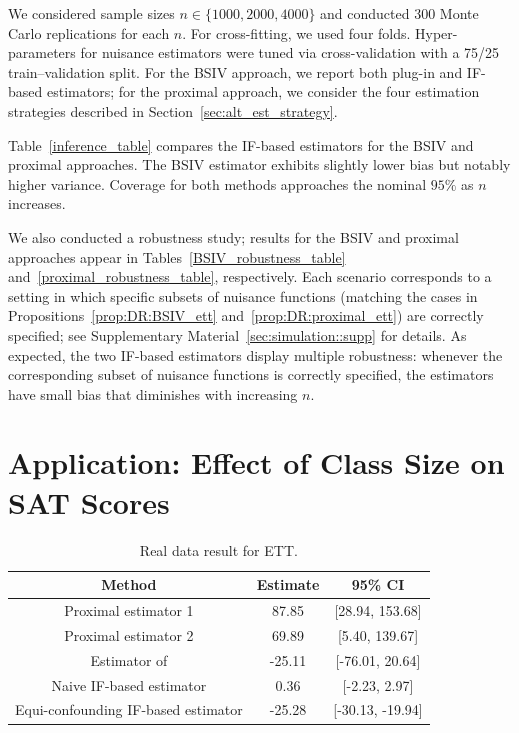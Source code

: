 \documentclass[10pt]{article}
\begin{document}
We considered sample sizes \(n \in \{1000, 2000, 4000\}\) and conducted 300 Monte Carlo replications for each \(n\). For cross-fitting, we used four folds. Hyper-parameters for nuisance estimators were tuned via cross-validation with a 75/25 train–validation split. For the BSIV approach, we report both plug-in and IF-based estimators; for the proximal approach, we consider the four estimation strategies described in Section~\ref{sec:alt_est_strategy}.

Table~\ref{inference_table} compares the IF-based estimators for the BSIV and proximal approaches. The BSIV estimator exhibits slightly lower bias but notably higher variance. Coverage for both methods approaches the nominal \(95\%\) as \(n\) increases.

We also conducted a robustness study; results for the BSIV and proximal approaches appear in Tables~\ref{BSIV_robustness_table} and~\ref{proximal_robustness_table}, respectively. Each scenario corresponds to a setting in which specific subsets of nuisance functions (matching the cases in Propositions~\ref{prop:DR:BSIV_ett} and~\ref{prop:DR:proximal_ett}) are correctly specified; see Supplementary Material~\ref{sec:simulation::supp} for details. As expected, the two IF-based estimators display multiple robustness: whenever the corresponding subset of nuisance functions is correctly specified, the estimators have small bias that diminishes with increasing \(n\).




\section{Application: Effect of Class Size on SAT Scores}
\label{sec:application}

\begin{table}[t]
\centering
\begin{tabular}{c | c c} 
 \hline
  Method & Estimate & 95\% CI \\ [0.5ex] 
 \hline
Proximal estimator 1 & 87.85 & [28.94, 153.68] \\
Proximal estimator 2 & 69.89 & [5.40, 139.67]\\
 \hline
Estimator of \cite{athey2020combining} & -25.11 & [-76.01, 20.64] \\
Naive IF-based estimator & 0.36 & [-2.23, 2.97]\\
Equi-confounding IF-based estimator & -25.28 & [-30.13, -19.94]\\
\hline
\end{tabular}
\caption{Real data result for ETT.}
\label{realdata_table}
\end{table}
\end{document}
